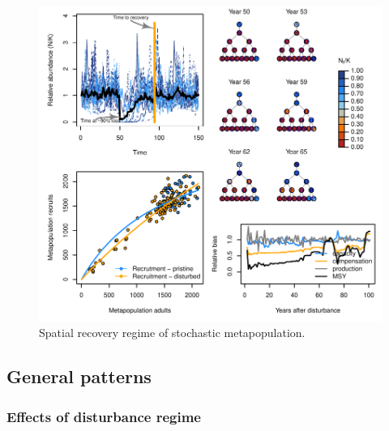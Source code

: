 \documentclass[]{article}
\begin{document}
\begin{figure}[H]

{\centering \includegraphics{Managing_for_ecological_surprises_in_metapopulations_files/figure-latex/example results4-1} 

}

\caption{Spatial recovery regime of stochastic metapopulation.}\label{fig:example results4}
\end{figure}
\newpage

\hypertarget{general-patterns}{%
\subsection{General patterns}\label{general-patterns}}

\hypertarget{effects-of-disturbance-regime}{%
\subsubsection{Effects of disturbance
regime}\label{effects-of-disturbance-regime}}
\end{document}
